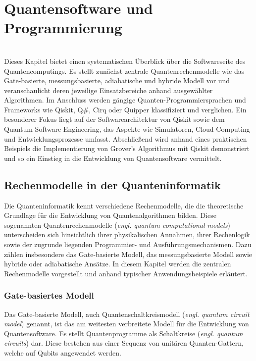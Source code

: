 \chapter{Quantensoftware und Programmierung}
\label{programming}


\abstract
\\
Dieses Kapitel bietet einen systematischen Überblick über die Softwareseite des Quantencomputings. Es stellt zunächst zentrale Quantenrechenmodelle wie das Gate-basierte, messungsbasierte, adiabatische und hybride Modell vor und veranschaulicht deren jeweilige Einsatzbereiche anhand ausgewählter Algorithmen. Im Anschluss werden gängige Quanten-Programmiersprachen und Frameworks wie Qiskit, Q\#, Cirq oder Quipper klassifiziert und verglichen. Ein besonderer Fokus liegt auf der Softwarearchitektur von Qiskit sowie dem Quantum Software Engineering, das Aspekte wie Simulatoren, Cloud Computing und Entwicklungsprozesse umfasst. Abschließend wird anhand eines praktischen Beispiels die Implementierung von Grover’s Algorithmus mit Qiskit demonstriert und so ein Einstieg in die Entwicklung von Quantensoftware vermittelt.

\section{Rechenmodelle in der Quanteninformatik}
\label{quantum-computation-models}

Die Quanteninformatik kennt verschiedene Rechenmodelle, die die theoretische Grundlage für die Entwicklung von Quantenalgorithmen bilden. Diese sogenannten Quantenrechenmodelle (\textit{engl. quantum computational models}) unterscheiden sich hinsichtlich ihrer physikalischen Annahmen, ihrer Rechenlogik sowie der zugrunde liegenden Programmier- und Ausführungsmechanismen. Dazu zählen insbesondere das Gate-basierte Modell, das messungsbasierte Modell sowie hybride oder adiabatische Ansätze. In diesem Kapitel werden die zentralen Rechenmodelle vorgestellt und anhand typischer Anwendungsbeispiele erläutert.

\subsection{Gate-basiertes Modell}
Das Gate-basierte Modell, auch Quantenschaltkreismodell (\textit{engl. quantum circuit model}) genannt, ist das am weitesten verbreitete Modell für die Entwicklung von Quantensoftware. Es stellt Quantenprogramme als Schaltkreise (\textit{engl. quantum circuits}) dar. Diese bestehen aus einer Sequenz von unitären Quanten-Gattern, welche auf Qubits angewendet werden.

